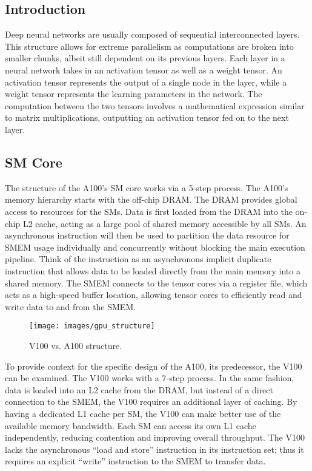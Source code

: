 \subsection{Introduction}
\label{subsec:introduction}
Deep neural networks are usually composed of sequential interconnected layers.
This structure allows for extreme parallelism as computations are broken into smaller chunks, albeit still dependent on its previous layers.
Each layer in a neural network takes in an activation tensor as well as a weight tensor.
An activation tensor represents the output of a single node in the layer, while a weight tensor represents the learning parameters in the network.
The computation between the two tensors involves a mathematical expression similar to matrix multiplications, outputting an activation tensor fed on to the next layer.

\subsection{SM Core}
\label{subsec:sm-core}
The structure of the A100's SM core works via a 5-step process.
The A100's memory hierarchy starts with the off-chip DRAM\@.
The DRAM provides global access to resources for the SMs.
Data is first loaded from the DRAM into the on-chip L2 cache, acting as a large pool of shared memory accessible by all SMs.
An asynchronous instruction will then be used to partition the data resource for SMEM usage individually and concurrently without blocking the main execution pipeline.
Think of the instruction as an asynchronous implicit duplicate instruction that allows data to be loaded directly from the main memory into a shared memory.
The SMEM connects to the tensor cores via a register file, which acts as a high-speed buffer location, allowing tensor cores to efficiently read and write data to and from the SMEM\@.

\begin{figure}[htbp!]
    \centerline{\texttt{[image: images/gpu\_structure]}}
    \caption{V100 vs. A100 structure.}
    \label{fig:v100a100struct}
\end{figure}

To provide context for the specific design of the A100, its predecessor, the V100 can be examined.
The V100 works with a 7-step process.
In the same fashion, data is loaded into an L2 cache from the DRAM, but instead of a direct connection to the SMEM, the V100 requires an additional layer of caching.
By having a dedicated L1 cache per SM, the V100 can make better use of the available memory bandwidth.
Each SM can access its own L1 cache independently, reducing contention and improving overall throughput.
The V100 lacks the asynchronous ``load and store'' instruction in its instruction set; thus it requires an explicit ``write'' instruction to the SMEM to transfer data.

